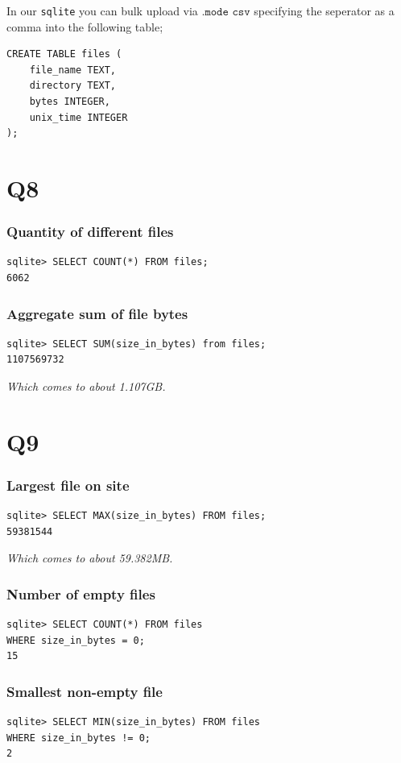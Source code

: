 \documentclass{article}
\begin{document}
In our \texttt{sqlite} you can bulk upload via $\texttt{.mode csv}$ specifying the seperator as a comma into the following table;

\begin{verbatim}
CREATE TABLE files (
    file_name TEXT,
    directory TEXT,
    bytes INTEGER,
    unix_time INTEGER
);
\end{verbatim}

\section*{Q8}
\subsubsection*{Quantity of different files}
\begin{verbatim}
sqlite> SELECT COUNT(*) FROM files;                                 
6062
\end{verbatim}

\subsubsection*{Aggregate sum of file bytes}
\begin{verbatim}
sqlite> SELECT SUM(size_in_bytes) from files;
1107569732
\end{verbatim}
\textit{Which comes to about 1.107GB.}

\section*{Q9}
\subsubsection*{Largest file on site}
\begin{verbatim}
sqlite> SELECT MAX(size_in_bytes) FROM files;
59381544
\end{verbatim}
\textit{Which comes to about 59.382MB.}

\subsubsection*{Number of empty files}
\begin{verbatim}
sqlite> SELECT COUNT(*) FROM files
WHERE size_in_bytes = 0;
15
\end{verbatim}

\subsubsection*{Smallest non-empty file}
\begin{verbatim}
sqlite> SELECT MIN(size_in_bytes) FROM files 
WHERE size_in_bytes != 0;
2
\end{verbatim}
\end{document}
